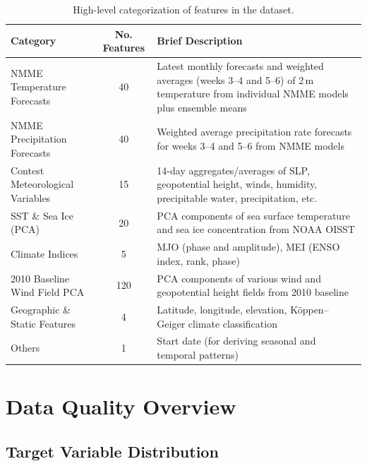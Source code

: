\begin{table}[H]
\centering
\caption{High-level categorization of features in the dataset.}
\label{tab:feature_categories}
\begin{tabular}{@{}lcp{7.5cm}@{}}
\toprule
\textbf{Category} & \textbf{No. Features} & \textbf{Brief Description} \\
\midrule
NMME Temperature Forecasts     & 40  & Latest monthly forecasts and weighted averages (weeks 3--4 and 5--6) of 2\,m temperature from individual NMME models plus ensemble means \\
NMME Precipitation Forecasts   & 40  & Weighted average precipitation rate forecasts for weeks 3--4 and 5--6 from NMME models \\
Contest Meteorological Variables & 15  & 14-day aggregates/averages of SLP, geopotential height, winds, humidity, precipitable water, precipitation, etc. \\
SST \& Sea Ice (PCA)           & 20  & PCA components of sea surface temperature and sea ice concentration from NOAA OISST \\
Climate Indices                & 5   & MJO (phase and amplitude), MEI (ENSO index, rank, phase) \\
2010 Baseline Wind Field PCA   & 120 & PCA components of various wind and geopotential height fields from 2010 baseline \\
Geographic \& Static Features  & 4   & Latitude, longitude, elevation, K\"{o}ppen--Geiger climate classification \\
Others                         & 1   & Start date (for deriving seasonal and temporal patterns) \\
\bottomrule
\end{tabular}
\end{table}


\newpage

\section{Data Quality Overview}

\subsection{Target Variable Distribution}


